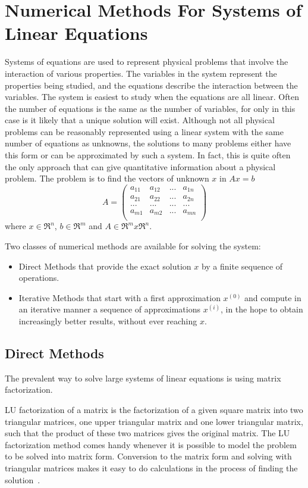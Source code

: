 \section{Numerical Methods For Systems of Linear Equations}
\label{sec:solvers}
Systems of equations are used to represent physical problems that involve the 
interaction of various properties. The variables in the system represent the 
properties being studied, and the equations describe the interaction between the 
variables. The system is easiest to study when the equations are all linear.  
Often the number of equations is the same as the number of variables, for only 
in this case is it likely that a unique solution will exist. Although not all 
physical problems can be reasonably represented using a linear system with the 
same number of equations as unknowns, the solutions to many problems either have 
this form or can be approximated by such a system. In fact, this is quite often 
the only approach that can give quantitative information about a physical 
problem. The problem is to find the vectors of unknown $x$ in $Ax = b$
$$
A=
\begin{pmatrix}
    a_{11}&a_{12}&...&a_{1n}\\
    a_{21}&a_{22}&...&a_{2n}\\
    ...&...&...&...\\
    a_{m1}&a_{m2}&...&a_{mn}\\
\end{pmatrix}
$$
where $x \in \Re^n$, $b \in \Re^m$ and $A \in \Re^m x \Re^n$.

Two classes of numerical methods are available for solving the system:
\begin{itemize}
    \item Direct Methods that provide the exact solution $x$ by a finite 
        sequence of operations.
    \item Iterative Methods that start with a first approximation $x^{(0)}$ and 
        compute in an iterative manner a sequence of approximations $x^{(i)}$, 
        in the hope to obtain increasingly better results, without ever reaching 
        $x$.
\end{itemize}

\subsection{Direct Methods}
The prevalent way to solve large systems of linear equations is using matrix 
factorization.

LU factorization of a matrix is the factorization of a given square matrix into 
two triangular matrices, one upper triangular matrix and one lower triangular 
matrix, such that the product of these two matrices gives the original matrix.  
The LU factorization method comes handy whenever it is possible to model the 
problem to be solved into matrix form. Conversion to the matrix form and solving 
with triangular matrices makes it easy to do calculations in the process of 
finding the solution~\cite{mc, nla}.

